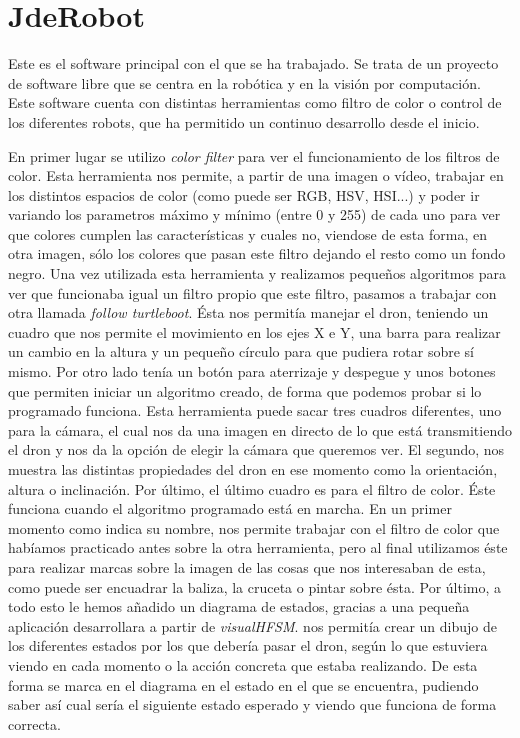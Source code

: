 \section{JdeRobot}
\hspace{1 cm} Este es el software principal con el que se ha trabajado. Se trata de un proyecto de software libre que se centra en la rob\'otica y en la visi\'on por computaci\'on. Este software cuenta con distintas herramientas como filtro de color o control de los diferentes robots, que ha permitido un continuo desarrollo desde el inicio. 

En primer lugar se utilizo \textit{color filter} para ver el funcionamiento de los filtros de color. Esta herramienta nos permite, a partir de una imagen o v\'ideo, trabajar en los distintos espacios de color (como puede ser RGB, HSV, HSI...) y poder ir variando los parametros m\'aximo y m\'inimo (entre 0 y 255) de cada uno para ver que colores cumplen las caracter\'isticas y cuales no, viendose de esta forma, en otra imagen, s\'olo los colores que pasan este filtro dejando el resto como un fondo negro. 
Una vez utilizada esta herramienta y realizamos pequeños algoritmos para ver que funcionaba igual un filtro propio que este filtro, pasamos a trabajar con otra llamada \textit{follow turtleboot}. \'Esta  nos permit\'ia manejar el dron, teniendo un cuadro que nos permite el movimiento en los ejes X e Y, una barra para realizar un cambio en la altura y un pequeño c\'irculo para que pudiera rotar sobre s\'i mismo. Por otro lado ten\'ia un bot\'on para aterrizaje y despegue y unos botones que permiten iniciar un algoritmo creado, de forma que podemos probar si lo programado funciona. Esta herramienta puede sacar tres cuadros diferentes, uno para la c\'amara, el cual nos da una imagen en directo de lo que est\'a transmitiendo el dron y nos da la opci\'on de elegir la c\'amara que queremos ver. El segundo, nos muestra las distintas propiedades del dron en ese momento como la orientaci\'on, altura o inclinaci\'on. Por \'ultimo, el \'ultimo cuadro es para el filtro de color. \'Este funciona cuando el algoritmo programado est\'a en marcha. En un primer momento como indica su nombre, nos permite trabajar con el filtro de color que hab\'iamos practicado antes sobre la otra herramienta, pero al final utilizamos \'este para realizar marcas sobre la imagen de las cosas que nos interesaban de esta, como puede ser encuadrar la baliza, la cruceta o pintar sobre \'esta. 
Por \'ultimo, a todo esto le hemos añadido un diagrama de estados, gracias a una pequeña aplicaci\'on desarrollara a partir de \textit{visualHFSM}. nos permit\'ia crear un dibujo de los diferentes estados por los que deber\'ia pasar el dron, seg\'un lo que estuviera viendo en cada momento o la acci\'on concreta que estaba realizando. De esta forma se marca en el diagrama en el estado en el que se encuentra, pudiendo saber as\'i cual ser\'ia el siguiente estado esperado y viendo que funciona de forma correcta.

